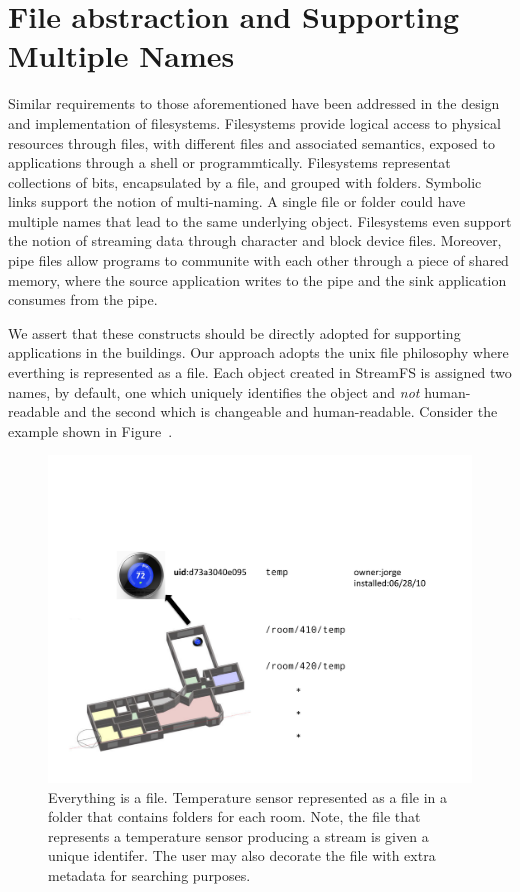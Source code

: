 \section{File abstraction and Supporting Multiple Names}
Similar requirements to those aforementioned have been addressed in the design and implementation of filesystems.  Filesystems provide
logical access to physical resources through files, with different files and associated semantics, exposed to applications through a shell
or programmtically.  Filesystems representat collections of bits, encapsulated by a file, and grouped with folders.  Symbolic links support
the notion of multi-naming.  A single file or folder could have multiple names that lead to the same underlying object.  Filesystems even
support the notion of streaming data through character and block device files.  Moreover, pipe files allow programs to communite with each
other through a piece of shared memory, where the source application writes to the pipe and the sink application consumes from the pipe.

We assert that these constructs should be directly adopted for supporting applications in the buildings.  Our approach adopts the unix
file philosophy where everthing is represented as a file.  Each object created in StreamFS is assigned two names, by default, one which 
uniquely identifies the object and \emph{not} human-readable and the second which is changeable and human-readable.  Consider
the example shown in Figure~\cite{fig:everythingfile}.


\begin{figure}[t!] %
\centering
\includegraphics[width=0.65\columnwidth]{figs/everythingfile}
\caption{Everything is a file.  Temperature sensor represented as a file in a folder that contains folders for each room.
Note, the file that represents a temperature sensor producing a stream is given a unique identifer.  The user may also
decorate the file with extra metadata for searching purposes.}
\label{fig:everythingfile}
\end{figure}

